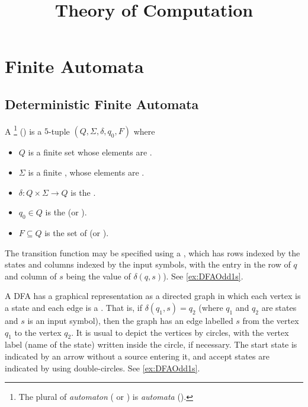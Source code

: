 
\title{\textbf{Theory of Computation}}

\date{}
\maketitle

\begingroup
\let\clearpage\relax
\tableofcontents
\endgroup

\clearpage


\section{Finite Automata}\label{sec:FA}

\subsection{Deterministic Finite Automata}\label{subsec:DFA}

A \footnote{The plural of \emph{automaton} ( or ) is \emph{automata} ().} () is a $5$-tuple $(Q, \Sigma, \delta, q_0, F)$ where
\begin{itemize}
\item $Q$ is a finite set whose elements are .
\item $\Sigma$ is a finite , whose elements are .
\item $\delta \colon Q \times \Sigma \to Q$ is the .
\item $q_0 \in Q$ is the  (or ).
\item $F \subseteq Q$ is the set of  (or ).
\end{itemize}

The transition function may be specified using a , which has rows indexed by the states and columns indexed by the input symbols, with the entry in the row of $q$ and column of $s$ being the value of $\delta(q, s)$). See \cref{ex:DFAOdd1s}.

A DFA has a graphical representation as a directed graph in which each vertex is a state and each edge is a . That is, if $\delta(q_1, s) = q_2$ (where $q_1$ and $q_2$ are states and $s$ is an input symbol), then the graph has an edge labelled $s$ from the vertex $q_1$ to the vertex $q_2$. It is usual to depict the vertices by circles, with the vertex label (name of the state) written inside the circle, if necessary. The start state is indicated by an arrow without a source entering it, and accept states are indicated by using double-circles. See \cref{ex:DFAOdd1s}.

